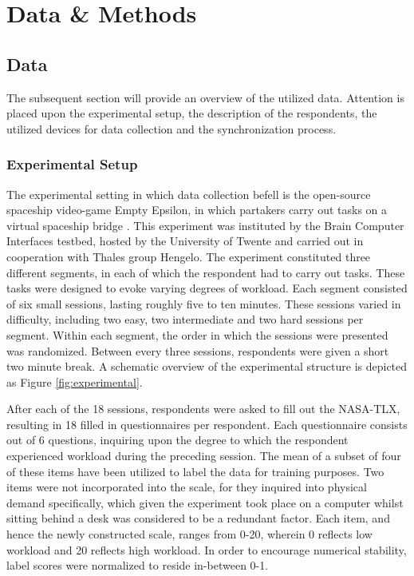 \documentclass[12pt]{article}
\begin{document}
\newpage
\section{Data \& Methods}

\subsection{Data}
The subsequent section will provide an overview of the utilized data. Attention is placed upon the experimental setup, the description of the respondents, the utilized devices for data collection and the synchronization process. 

\subsubsection{Experimental Setup}
The experimental setting in which data collection befell is the open-source spaceship video-game Empty Epsilon, in which partakers carry out tasks on a virtual spaceship bridge \cite{daid2016empty}. This experiment was instituted by the Brain Computer Interfaces testbed, hosted by the University of Twente and carried out in cooperation with Thales group Hengelo. The experiment constituted three different segments, in each of which the respondent had to carry out tasks. These tasks were designed to evoke varying degrees of workload. Each segment consisted of six small sessions, lasting roughly five to ten minutes. These sessions varied in difficulty, including two easy, two intermediate and two hard sessions per segment. Within each segment, the order in which the sessions were presented was randomized. Between every three sessions, respondents were given a short two minute break. A schematic overview of the experimental structure is depicted as Figure \ref{fig:experimental}. 

After each of the 18 sessions, respondents were asked to fill out the NASA-TLX, resulting in 18 filled in questionnaires per respondent. Each questionnaire consists out of 6 questions, inquiring upon the degree to which the respondent experienced workload during the preceding session. The mean of a subset of four of these items have been utilized to label the data for training purposes.  Two items were not incorporated into the scale, for they inquired into physical demand specifically, which given the experiment took place on a computer whilst sitting behind a desk was considered to be a redundant factor. Each item, and hence the newly constructed scale, ranges from 0-20, wherein 0 reflects low workload and 20 reflects high workload.  In order to encourage numerical stability, label scores were normalized to reside in-between 0-1. 
\end{document}
